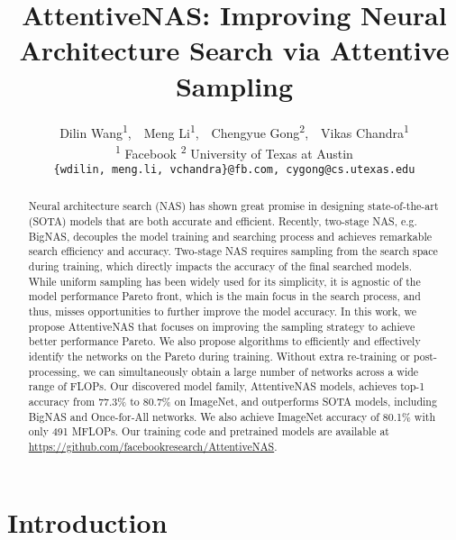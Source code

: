 \documentclass[final]{cvpr}
\theoremstyle{definition}
\begin{document}
\renewcommand{\L}{{\mathcal L}}
\newcommand{\KD}{{\mathcal L}_{kd}}

\title{AttentiveNAS: Improving Neural Architecture Search via Attentive Sampling}

\author{
Dilin Wang\textsuperscript{1},~~Meng Li\textsuperscript{1},~~Chengyue Gong\textsuperscript{2},~~Vikas Chandra\textsuperscript{1} \\
\textsuperscript{1} Facebook  \hspace{10pt} \textsuperscript{2} University of Texas at Austin \\
{\tt \small \{wdilin, meng.li, vchandra\}@fb.com, cygong@cs.utexas.edu}
}

\maketitle
\pagestyle{empty}
\thispagestyle{empty}

\begin{abstract}

Neural architecture search (NAS) has shown great promise in designing state-of-the-art (SOTA) models that are both accurate and efficient. 
Recently, two-stage NAS, e.g. BigNAS,
decouples the model training and searching process and achieves remarkable search efficiency and accuracy. 
Two-stage NAS requires sampling from the search space during training, 
which directly impacts the accuracy of the final searched models.
While uniform sampling has been widely used for its simplicity, it is agnostic of the model performance Pareto front, which is the main focus in the search process, and thus, misses opportunities to further improve the model accuracy. 
In this work, we propose AttentiveNAS that focuses on improving the sampling strategy to achieve better performance Pareto.
We also propose algorithms to efficiently and effectively identify the networks on the Pareto during training.
Without extra re-training or post-processing, we can simultaneously obtain a large number of networks across a wide range of FLOPs. Our discovered model family, AttentiveNAS models, achieves top-1 accuracy from 77.3\% to 80.7\% on ImageNet, and outperforms SOTA models, including BigNAS and Once-for-All networks. We also achieve ImageNet accuracy of 80.1\% with only 491 MFLOPs.
Our training code and pretrained models are available at \url{https://github.com/facebookresearch/AttentiveNAS}.

\end{abstract}


\section{Introduction}
\end{document}
